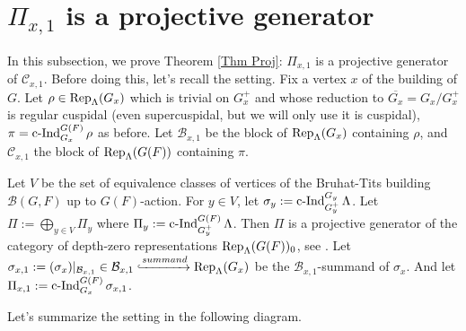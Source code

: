 	
	
	
	\section{$\Pi_{x,1}$ is a projective generator}\label{Section projective generator}
	
	In this subsection, we prove Theorem \ref{Thm Proj}: $\Pi_{x,1}$ is a projective generator of $\mathcal{C}_{x,1}$. Before doing this, let's recall the setting. Fix a vertex $x$ of the building of $G$. Let $\rho \in \operatorname{\operatorname{Rep}}_{\Lambda}(G_x)$ which is trivial on $G_x^+$ and whose reduction to $\overline{G_x}=G_x/G_x^+$ is regular cuspidal (even supercuspidal, but we will only use it is cuspidal), $\pi=\operatorname{\operatorname{c-Ind}}_{G_x}^{G(F)}\rho$ as before. Let $\mathcal{B}_{x,1}$ be the block of $\operatorname{\operatorname{Rep}}_{\Lambda}(G_x)$ containing $\rho$, and $\mathcal{C}_{x,1}$ the block of $\operatorname{\operatorname{Rep}}_{\Lambda}(G(F))$ containing $\pi$. 
	
	Let $V$ be the set of equivalence classes of vertices of the Bruhat-Tits building $\mathcal{B}(G, F)$ up to $G(F)$-action. For $y \in V$, let $\sigma_y:=\operatorname{\operatorname{c-Ind}}_{G_y^+}^{G_y}\Lambda$. Let $\Pi:=\bigoplus_{y \in V}\Pi_y$ where $\Pi_y:=\operatorname{\operatorname{c-Ind}}_{G_y^+}^{G(F)}\Lambda$. Then $\Pi$ is a projective generator of the category of depth-zero representations $\operatorname{\operatorname{Rep}}_{\Lambda}(G(F))_0$, see \cite[Appendix]{dat2009finitude}. Let $\sigma_{x,1}:=(\sigma_x)|_{\mathcal{B}_{x,1}} \in \mathcal{B}_{x,1} \xhookrightarrow{summand} \operatorname{\operatorname{Rep}}_{\Lambda}(G_x)$ be the $\mathcal{B}_{x,1}$-summand of $\sigma_x$. And let $\Pi_{x,1}:=\operatorname{\operatorname{c-Ind}}_{G_x}^{G(F)}\sigma_{x,1}$.
	
	Let's summarize the setting in the following diagram.
	
	
